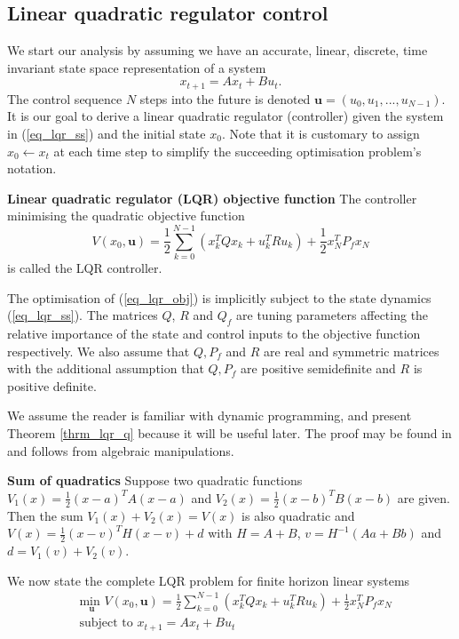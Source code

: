 \subsection{Linear quadratic regulator control}
\label{sec_lqr_lit}
We start our analysis by assuming we have an accurate, linear, discrete, time invariant state space representation of a system 
\begin{equation}
x_{t+1} = Ax_t+ Bu_t.
\label{eq_lqr_ss}
\end{equation}
The control sequence $N$ steps into the future is denoted $\mathbf{u}=(u_0, u_1,...,u_{N-1})$. It is our goal to derive a linear quadratic regulator (controller) given the system in (\ref{eq_lqr_ss}) and the initial state $x_0$. Note that it is customary to assign $x_0 \leftarrow x_t$ at each time step to simplify the succeeding optimisation problem's notation.
\begin{defn}
\textbf{Linear quadratic regulator (LQR) objective function} The controller minimising the quadratic objective function
\begin{equation}
V(x_0, \mathbf{u}) = \frac{1}{2}\sum_{k=0}^{N-1} \left( x_k^TQx_k + u_k^TRu_k \right) + \frac{1}{2}x_N^TP_fx_N
\label{eq_lqr_obj}
\end{equation}
is called the LQR controller.

The optimisation of (\ref{eq_lqr_obj}) is implicitly subject to the state dynamics (\ref{eq_lqr_ss}). The matrices $Q$, $R$ and $Q_f$ are tuning parameters affecting the relative importance of the state and control inputs to the objective function respectively. We also assume that $Q, P_f$ and $R$ are real and symmetric matrices with the additional assumption that $Q, P_f$ are positive semidefinite and $R$ is positive definite.
\label{def_lqr}
\end{defn}
We assume the reader is familiar with dynamic programming, and present Theorem \ref{thrm_lqr_q} because it will be useful later. The proof may be found in \cite{raw} and follows from algebraic manipulations.
\begin{thrm}
\textbf{Sum of quadratics} Suppose two quadratic functions $V_1(x) = \frac{1}{2}(x-a)^TA(x-a)$ and $V_2(x) = \frac{1}{2}(x-b)^TB(x-b)$ are given. Then the sum $V_1(x) + V_2(x) = V(x)$ is also quadratic and $V(x) = \frac{1}{2}(x-v)^TH(x-v)+d$ with $H = A+B$, $v = H^{-1}(Aa+Bb)$ and $d = V_1(v) + V_2(v)$.
\label{thrm_lqr_q}
\end{thrm}
We now state the complete LQR problem for finite horizon linear systems\begin{equation}
\begin{aligned}
&\underset{\mathbf{u}}{\text{min }} V(x_0, \mathbf{u}) = \frac{1}{2}\sum_{k=0}^{N-1} \left( x_k^TQx_k + u_k^TRu_k \right) + \frac{1}{2}x_N^TP_fx_N \\
& \text{subject to } x_{t+1}=Ax_t+Bu_t
\end{aligned}
\label{eq_lqr_problem}
\end{equation}
